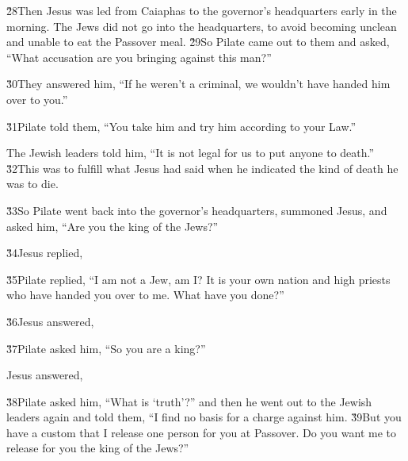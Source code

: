 \v{28}Then Jesus was led from Caiaphas to the governor's headquarters early in the morning. The Jews did not go into the headquarters, to avoid becoming unclean and unable to eat the Passover meal. \v{29}So Pilate came out to them and asked, ``What accusation are you bringing against this man?''

\v{30}They answered him, ``If he weren't a criminal, we wouldn't have handed him over to you.''

\v{31}Pilate told them, ``You take him and try him according to your Law.''

The Jewish leaders told him, ``It is not legal for us to put anyone to death.'' \v{32}This was to fulfill what Jesus had said when he indicated the kind of death he was to die.

\v{33}So Pilate went back into the governor's headquarters, summoned Jesus, and asked him, ``Are you the king of the Jews?''

\v{34}Jesus replied, 

\v{35}Pilate replied, ``I am not a Jew, am I? It is your own nation and high priests who have handed you over to me. What have you done?''

\v{36}Jesus answered, 

\v{37}Pilate asked him, ``So you are a king?''

Jesus answered, 

\v{38}Pilate asked him, ``What is `truth'?'' and then he went out to the Jewish leaders again and told them, ``I find no basis for a charge against him. \v{39}But you have a custom that I release one person for you at Passover. Do you want me to release for you the king of the Jews?''

